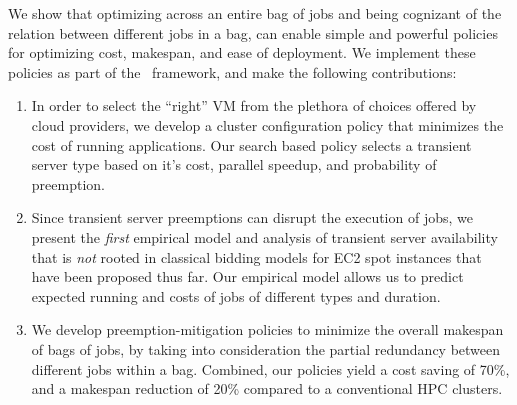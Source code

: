 %
We show that optimizing across an entire bag of jobs and being cognizant of the relation between different jobs in a bag, can enable simple and powerful policies for optimizing cost, makespan, and ease of deployment. 
%
We implement these policies as part of the \sysname~framework, and make the following contributions:
\begin{enumerate}[leftmargin=12pt]
\item In order to select the ``right'' VM from the plethora of choices offered by cloud providers, we develop a cluster configuration policy that minimizes the cost of running applications. Our search based policy selects a transient server type based on it's cost, parallel speedup, and probability of preemption. 

  
\item Since transient server preemptions can disrupt the execution of jobs, we present the \emph{first} empirical model and analysis of transient server availability that is \emph{not} rooted in classical bidding models for EC2 spot instances that have been proposed thus far. Our empirical model allows us to predict expected running and costs of jobs of different types and duration.

  
\item We develop preemption-mitigation policies to minimize the overall makespan of bags of jobs, by taking into consideration the partial redundancy between different jobs within a bag. Combined, our policies yield a cost saving of 70\%, and a makespan reduction of 20\% compared to a conventional HPC clusters. 

\end{enumerate}

